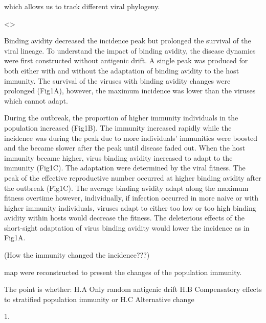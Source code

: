 \documentclass[12pt,a4paper]{article}
\begin{document}
which allows us to track different viral phylogeny. 


<>

Binding avidity decreased the incidence peak but prolonged the survival of the viral lineage. To understand the impact of binding avidity, the disease dynamics were first constructed without antigenic drift. A single peak was produced for both either with and without the adaptation of binding avidity to the host immunity. The survival of the viruses with binding avidity changes were prolonged (Fig1A), however, the maximum incidence was lower than the viruses which cannot adapt.

During the outbreak, the proportion of higher immunity individuals in the population increased (Fig1B). The immunity increased rapidly while the incidence was during the peak due to more individuals' immunities were boosted and the became slower after the peak until disease faded out. When the host immunity became higher, virus binding avidity increased to adapt to the immunity (Fig1C). The adaptation were determined by the viral fitness. The peak of the effective reproductive number occurred at higher binding avidity after the outbreak (Fig1C). The average binding avidity adapt along the maximum fitness overtime however, individually, if infection occurred in more naive or with higher immunity individuals, viruses adapt to either too low or too high binding avidity within hosts would decrease the fitness. The deleterious effects of the short-sight adaptation of virus binding avidity would lower the incidence as in Fig1A.   



     
(How the immunity changed the incidence???)


 


map were reconstructed to present the changes of the population immunity. 


 

The point is whether:
H.A Only random antigenic drift
H.B Compensatory effects to stratified population immunity or
H.C Alternative change

1.   





  
 




 
 




  
\end{document}
